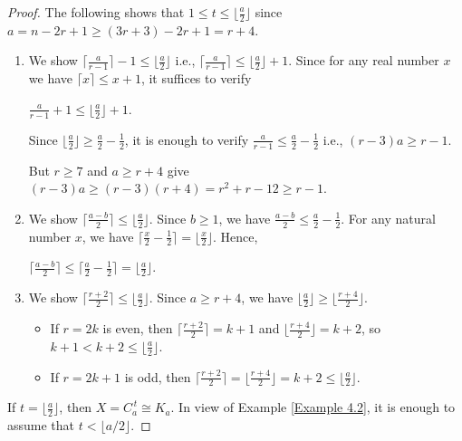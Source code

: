 \documentclass[12pt,reqno,a4paper]{amsart}
\theoremstyle{definition}
\begin{document}
\begin{proof}
The following shows that $1\le t\le\lfloor \frac{a}{2}\rfloor$ since $a=n-2r+1\geq (3r+3)-2r+1=r+4$.
\begin{enumerate}
    \item We show
$\Big\lceil\frac a{r-1}\Big\rceil-1 \le \Big\lfloor\frac a2\Big\rfloor$ i.e., 
$\Big\lceil\frac a{r-1}\Big\rceil \le \Big\lfloor\frac a2\Big\rfloor +1$.
Since for any real number $x$ we have $\lceil x\rceil \le x+1$, it suffices to verify

\begin{center}
$\frac a{r-1} + 1 \le \Big\lfloor\frac a2\Big\rfloor +1$.   
\end{center}

Since $\lfloor \frac{a}{2}\rfloor \ge \frac{a}{2} - \frac{1}{2}$, it is enough to verify
$
\frac a{r-1} \le \frac{a}{2} - \frac{1}{2}$ i.e., 
$(r-3)a \ge r-1$.

But $r\ge7$ and $a\ge r+4$ give
$(r-3)a \ge (r-3)(r+4) = r^2 + r - 12 \ge r-1
$. 

\item  We show
$\Big\lceil\frac{a-b}{2}\Big\rceil \le \Big\lfloor\frac a2\Big\rfloor.$
Since $b\ge1$, we have
$\frac{a-b}{2}\leq \frac{a}{2} - \frac{1}{2}$. For any natural number $x$, we have
$\lceil \frac{x}{2}-\frac{1}{2}\rceil = \lfloor \frac{x}{2}\rfloor$. Hence,
\begin{center}
$\lceil\frac{a-b}{2}\rceil \le \lceil \frac a2 - \frac12\rceil
=\lfloor\frac a2\rfloor$.    
\end{center}

\item  We show
$
\Big\lceil\frac{r+2}{2}\Big\rceil \le \Big\lfloor\frac a2\Big\rfloor.
$
Since $a\ge r+4$, we have $\lfloor \frac{a}{2}\rfloor \ge \lfloor \frac{r+4}{2}\rfloor$.

\begin{itemize}
  \item If $r=2k$ is even, then $\lceil\frac{r+2}{2}\rceil = k+1$ and
  $\lfloor\frac{r+4}{2}\rfloor = k+2$, so $k+1 < k+2 \le \lfloor \frac{a}{2}\rfloor$.
  \item If $r=2k+1$ is odd, then $\lceil\frac{r+2}{2}\rceil =\lfloor\frac{r+4}{2}\rfloor= k+2\leq \lfloor \frac{a}{2}\rfloor$.
\end{itemize}
\end{enumerate}


If $t=\lfloor \frac{a}{2}\rfloor$, then $X=C_a^{\,t}\cong K_a$.
In view of Example \ref{Example 4.2}, it is enough to assume that $t<\lfloor a/2\rfloor$. 


\end{proof}
\end{document}
